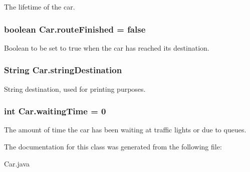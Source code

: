 The lifetime of the car. 

\hypertarget{class_car_aefe0e86fc27b1175e338447493c169a4}{
\subsubsection[{route\+Finished}]{\setlength{\rightskip}{0pt plus 5cm}boolean Car.\+route\+Finished = false\hspace{0.3cm}{\ttfamily [protected]}}}\label{class_car_aefe0e86fc27b1175e338447493c169a4}


Boolean to be set to true when the car has reached its destination. 

\hypertarget{class_car_a94ad7e01cd9c699c28bd77b773b883fe}{
\subsubsection[{string\+Destination}]{\setlength{\rightskip}{0pt plus 5cm}String Car.\+string\+Destination\hspace{0.3cm}{\ttfamily [protected]}}}\label{class_car_a94ad7e01cd9c699c28bd77b773b883fe}


String destination, used for printing purposes. 

\hypertarget{class_car_a523ff2c3f03e44be3ca40596f8e0ca43}{
\subsubsection[{waiting\+Time}]{\setlength{\rightskip}{0pt plus 5cm}int Car.\+waiting\+Time = 0\hspace{0.3cm}{\ttfamily [protected]}}}\label{class_car_a523ff2c3f03e44be3ca40596f8e0ca43}


The amount of time the car has been waiting at traffic lights or due to queues. 



The documentation for this class was generated from the following file\+:\begin{DoxyCompactItemize}
\item 
Car.\+java\end{DoxyCompactItemize}
